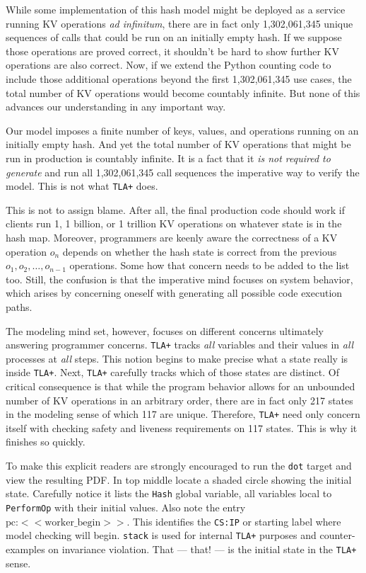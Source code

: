 \documentclass[twocolumn]{article}
\begin{document}
While some implementation of this hash model might be deployed as a service running KV operations \emph{ad infinitum}, there are in fact only 1,302,061,345 unique sequences of calls that could be run on an initially empty hash. If we suppose those operations are proved correct, it shouldn't be hard to show further KV operations are also correct. Now, if we extend the Python counting code to include those additional operations beyond the first 1,302,061,345 use cases, the total number of KV operations would become countably infinite. But none of this advances our understanding in any important way.

Our model imposes a finite number of keys, values, and operations running on an initially empty hash. And yet the total number of KV operations that might be run in production is countably infinite. It is a fact that it \emph{is not required to generate} and run all 1,302,061,345 call sequences the imperative way to verify the model. This is not what \texttt{TLA+} does. 

This is not to assign blame. After all, the final production code should work if clients run 1, 1 billion, or 1 trillion KV operations on whatever state is in the hash map. Moreover, programmers are keenly aware the correctness of a KV operation $o_n$ depends on whether the hash state is correct from the previous $o_1,o_2,\ldots,o_{n-1}$ operations. Some how that concern needs to be added to the list too. Still, the confusion is that the imperative mind focuses on system behavior, which arises by concerning oneself with generating all possible code execution paths. 

The modeling mind set, however, focuses on different concerns ultimately answering programmer concerns. \texttt{TLA+} tracks \emph{all} variables and their values in \emph{all} processes at \emph{all} steps. This notion begins to make precise what a state really is inside \texttt{TLA+}. Next, \texttt{TLA+} carefully tracks which of those states are distinct. Of critical consequence is that while the program behavior allows for an unbounded number of KV operations in an arbitrary order, there are in fact only 217 states in the modeling sense of which 117 are unique. Therefore, \texttt{TLA+} need only concern itself with checking safety and liveness requirements on 117 states. This is why it finishes so quickly.

To make this explicit readers are strongly encouraged to run the \texttt{dot} target and view the resulting PDF. In top middle locate a shaded circle showing the initial state. Carefully notice it lists the \texttt{Hash} global variable, all variables local to \texttt{PerformOp} with their initial values. Also note the entry $\text{pc:}<<\text{worker\_begin}>>$. This identifies the \texttt{CS:IP} or starting label where model checking will begin. \texttt{stack} is used for internal \texttt{TLA+} purposes and counter-examples on invariance violation.
That --- that! --- is the initial state in the \texttt{TLA+} sense. 
\end{document}
